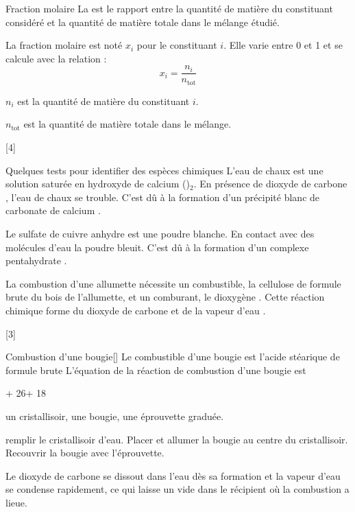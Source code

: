 \begin{doc}{Fraction molaire}
  La  est le rapport entre la quantité de matière du constituant considéré et la quantité de matière totale dans le mélange étudié.

  La fraction molaire est noté $x_i$ pour le constituant $i$. Elle varie entre 0 et 1 et se calcule avec la relation :
  \begin{equation*}
    x_i = \dfrac{n_i}{n_\text{tot}}
  \end{equation*}

  $n_i$ est la quantité de matière du constituant $i$.

  $n_\text{tot}$ est la quantité de matière totale dans le mélange.
\end{doc}

[4]


\begin{doc}{Quelques tests pour identifier des espèces chimiques}
  \pointCyan L'eau de chaux est une solution saturée en hydroxyde de calcium ()$_2$.
  En présence de dioxyde de carbone \dioxydeDeCarbone, l'eau de chaux se trouble. C'est dû à la formation d'un précipité blanc de carbonate de calcium .

  \pointCyan Le sulfate de cuivre anhydre  est une poudre blanche.
  En contact avec des molécules d'eau \eau la poudre bleuit. C'est dû à la formation d'un complexe pentahydrate .

  \pointCyan La combustion d'une allumette nécessite un combustible, la cellulose de formule brute  du bois de l'allumette, et un comburant, le dioxygène \dioxygene.
  Cette réaction chimique forme du dioxyde de carbone \dioxydeDeCarbone et de la vapeur d'eau \eau.
\end{doc}

[3]


\begin{doc}{Combustion d'une bougie}[\label{doc:combustion_bougie}]
  Le combustible d'une bougie est l'acide stéarique de formule brute 
  L'équation de la réaction de combustion d'une bougie est
  \begin{center}
    \sol + 26\dioxygene\gaz {}\dioxydeDeCarbone\gaz + 18\eau\gaz
  \end{center}

   un cristallisoir, une bougie, une éprouvette graduée.

   remplir le cristallisoir d'eau.
  Placer et allumer la bougie au centre du cristallisoir.
  Recouvrir la bougie avec l'éprouvette.

  Le dioxyde de carbone se dissout dans l'eau dès sa formation et la vapeur d'eau se condense rapidement, ce qui laisse un vide dans le récipient où la combustion a lieue.
\end{doc}

